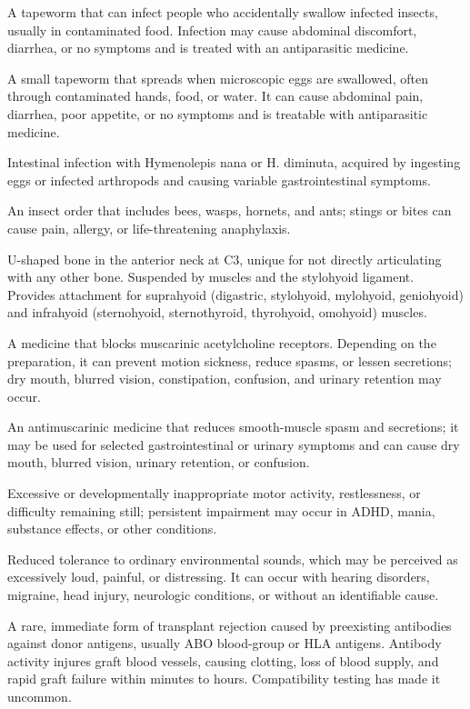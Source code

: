  A tapeworm that can infect people who accidentally swallow infected insects, usually in contaminated food. Infection may cause abdominal discomfort, diarrhea, or no symptoms and is treated with an antiparasitic medicine.

 A small tapeworm that spreads when microscopic eggs are swallowed, often through contaminated hands, food, or water. It can cause abdominal pain, diarrhea, poor appetite, or no symptoms and is treatable with antiparasitic medicine.

 Intestinal infection with Hymenolepis nana or H. diminuta, acquired by ingesting eggs or infected arthropods and causing variable gastrointestinal symptoms.

 An insect order that includes bees, wasps, hornets, and ants; stings or bites can cause pain, allergy, or life-threatening anaphylaxis.

 U-shaped bone in the anterior neck at C3, unique for not directly articulating with any
other bone. Suspended by muscles and the stylohyoid ligament. Provides attachment for
suprahyoid (digastric, stylohyoid, mylohyoid, geniohyoid) and infrahyoid (sternohyoid,
sternothyroid, thyrohyoid, omohyoid) muscles.

 A medicine that blocks muscarinic acetylcholine receptors. Depending on the preparation, it can prevent motion sickness, reduce spasms, or lessen secretions; dry mouth, blurred vision, constipation, confusion, and urinary retention may occur.

 An antimuscarinic medicine that reduces smooth-muscle spasm and secretions; it may be used for selected gastrointestinal or urinary symptoms and can cause dry mouth, blurred vision, urinary retention, or confusion.

 Excessive or developmentally inappropriate motor activity, restlessness, or difficulty remaining still; persistent impairment may occur in ADHD, mania, substance effects, or other conditions.

 Reduced tolerance to ordinary environmental sounds, which may be perceived as excessively loud, painful, or distressing. It can occur with hearing disorders, migraine, head injury, neurologic conditions, or without an identifiable cause.

 A rare, immediate form of transplant rejection caused by preexisting
antibodies against donor antigens, usually ABO blood-group or HLA antigens. Antibody activity injures
graft blood vessels, causing clotting, loss of blood supply, and rapid graft failure within minutes to
hours. Compatibility testing has made it uncommon.

